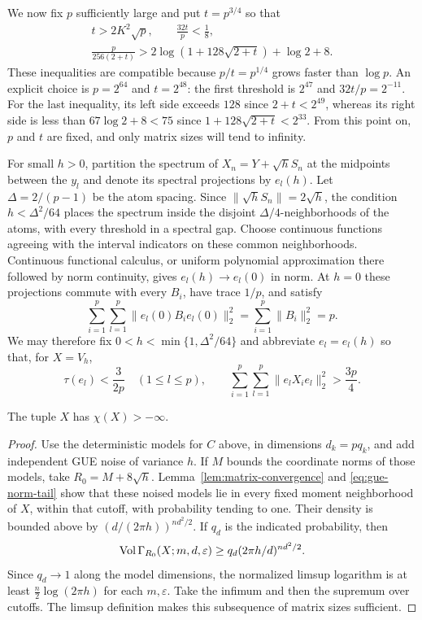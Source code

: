 We now fix $p$ sufficiently large and put $t=p^{3/4}$ so that
\begin{equation}\label{eq:parameters}
 \begin{gathered}
 t>2K^2\sqrt p,\qquad \frac{32t}{p}<\frac18,\\
 \frac{p}{256(2+t)}>
 2\log(1+128\sqrt{2+t})+\log2+8.
 \end{gathered}
\end{equation}
These inequalities are compatible because $p/t=p^{1/4}$ grows faster
than $\log p$. An explicit choice is $p=2^{64}$ and $t=2^{48}$:
the first threshold is $2^{47}$ and $32t/p=2^{-11}$.
For the last inequality, its left side exceeds $128$ since
$2+t<2^{49}$, whereas its right side is less than
$67\log2+8<75$ since $1+128\sqrt{2+t}<2^{33}$.
From this point on, $p$ and $t$ are fixed, and only matrix sizes will
tend to infinity.

For small $h>0$, partition the spectrum of $X_n=Y+\sqrt h S_n$ at the
midpoints between the $y_l$ and denote its spectral projections by $e_l(h)$.
Let $\Delta=2/(p-1)$ be the atom spacing. Since
$\|\sqrt h S_n\|=2\sqrt h$, the condition $h<\Delta^2/64$ places
the spectrum inside the disjoint $\Delta/4$-neighborhoods of the atoms,
with every threshold in a spectral gap. Choose continuous functions
agreeing with the interval indicators on these common neighborhoods.
Continuous functional calculus, or uniform polynomial approximation
there followed by norm continuity, gives $e_l(h)\to e_l(0)$ in norm.
At $h=0$ these projections commute with every $B_i$, have trace $1/p$,
and satisfy
\[
 \sum_{i=1}^p\sum_{l=1}^p\|e_l(0)B_i e_l(0)\|_2^2
 =\sum_{i=1}^p\|B_i\|_2^2=p.
\]
We may therefore fix $0<h<\min\{1,\Delta^2/64\}$ and abbreviate
$e_l=e_l(h)$ so that, for $X=V_h$,
\begin{equation}\label{eq:smallblocks}
 \tau(e_l)<\frac{3}{2p}\quad(1\leq l\leq p),\qquad
 \sum_{i=1}^p\sum_{l=1}^p\|e_lX_i e_l\|_2^2>\frac{3p}{4}.
\end{equation}

\begin{lemma}\label{lem:finitechi}
The tuple $X$ has $\chi(X)>-\infty$.
\end{lemma}

\begin{proof}
Use the deterministic models for $C$ above, in dimensions $d_k=pq_k$,
and add independent GUE noise of variance $h$.
If $M$ bounds the coordinate norms of those models, take
$R_0=M+8\sqrt h$. Lemma~\ref{lem:matrix-convergence} and
\eqref{eq:gue-norm-tail} show that these noised models lie in every
fixed moment neighborhood of $X$, within that cutoff, with probability
tending to one. Their density is bounded above by
$(d/(2\pi h))^{nd^2/2}$. If $q_d$ is the indicated probability, then
\[
 \operatorname{Vol}\Gamma_{R_0}(X;m,d,\varepsilon)
 \geq q_d(2\pi h/d)^{nd^2/2}.
\]
Since $q_d\to1$ along the model dimensions, the normalized limsup
logarithm is at least $\frac n2\log(2\pi h)$ for each $m,\varepsilon$.
Take the infimum and then the supremum over cutoffs. The limsup definition
makes this subsequence of matrix sizes sufficient.
\end{proof}
